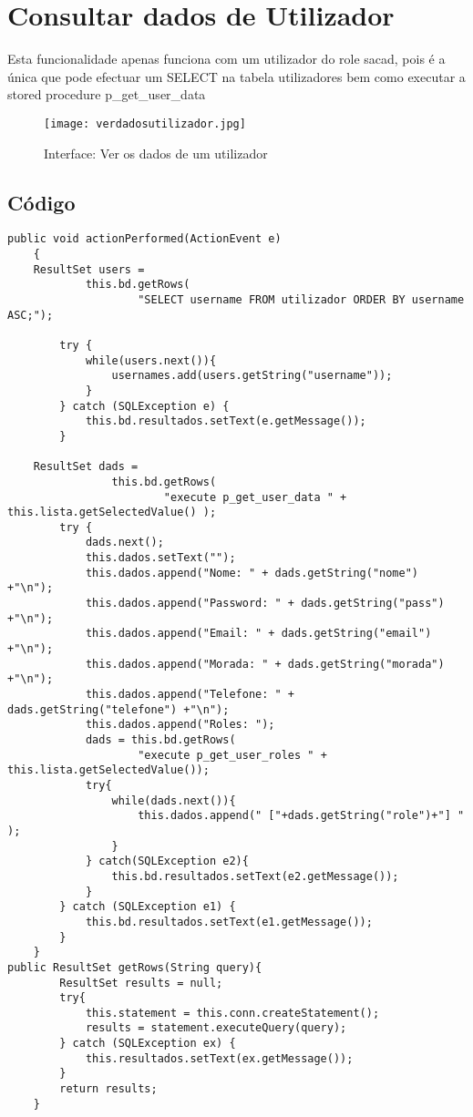 \section{Consultar dados de Utilizador}
Esta funcionalidade apenas funciona com um utilizador do role sacad, pois é a única que pode efectuar um SELECT na tabela utilizadores bem como executar a stored procedure p\_get\_user\_data

\begin{figure}[!htbp]
\centering
\texttt{[image: verdadosutilizador.jpg]}
\caption{Interface: Ver os dados de um utilizador}
\label{fig:dados1}
\end{figure}

\subsection{Código}
\begin{lstlisting}
public void actionPerformed(ActionEvent e)
    {
	ResultSet users = 
			this.bd.getRows(
					"SELECT username FROM utilizador ORDER BY username ASC;");
		
		try {
			while(users.next()){
				usernames.add(users.getString("username"));
			}
		} catch (SQLException e) {
			this.bd.resultados.setText(e.getMessage());
		}

	ResultSet dads = 
				this.bd.getRows(
						"execute p_get_user_data " + this.lista.getSelectedValue() );
		try {
			dads.next();
			this.dados.setText("");
			this.dados.append("Nome: " + dads.getString("nome") +"\n");
			this.dados.append("Password: " + dads.getString("pass") +"\n");
			this.dados.append("Email: " + dads.getString("email") +"\n");
			this.dados.append("Morada: " + dads.getString("morada") +"\n");
			this.dados.append("Telefone: " + dads.getString("telefone") +"\n");
			this.dados.append("Roles: ");
			dads = this.bd.getRows(
					"execute p_get_user_roles " + this.lista.getSelectedValue());
			try{
				while(dads.next()){
					this.dados.append(" ["+dads.getString("role")+"] " );
				}
			} catch(SQLException e2){
				this.bd.resultados.setText(e2.getMessage());
			}
		} catch (SQLException e1) {
			this.bd.resultados.setText(e1.getMessage());
		}
	}
public ResultSet getRows(String query){
		ResultSet results = null;
		try{
			this.statement = this.conn.createStatement();
			results = statement.executeQuery(query);
		} catch (SQLException ex) {
			this.resultados.setText(ex.getMessage());
		}
		return results;
	}
\end{lstlisting}

